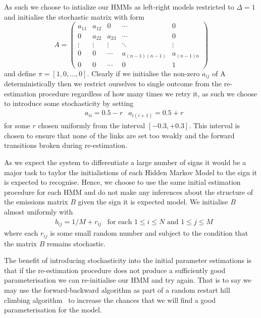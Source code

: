 As such we choose to intialize our HMMs as left-right models restricted to $\Delta = 1$ and initialise the stochastic matrix with form
\begin{equation*}
A =
 \begin{pmatrix}
  a_{11} & a_{12} & 0 & \cdots & 0 \\
  0 & a_{22} & a_{23} &\cdots & 0 \\
  \vdots  & \vdots  & \vdots & \ddots & \vdots  \\
  0 & 0 & \cdots & a_{(n-1)(n-1)}& a_{(n-1)n} \\
  0 & 0 & \cdots & 0& 1
 \end{pmatrix}
\end{equation*}
and define $\pi = [1,0, \dots, 0]$. Clearly if we initialise the non-zero $a_{ij}$ of A deterministically then we restrict ourselves to single outcome from the re-estimation procedure regardless of how many times we retry it, as such we choose to introduce some stochasticity by setting
\begin{align*}
&a_{ii} = 0.5 - r &a_{i(i+1)} = 0.5 + r
\end{align*}
 for some $r$ chosen uniformly from the interval $[-0.3, +0.3]$. This interval is chosen to ensure that none of the links are set too weakly and the forward transitions broken during re-estimation.

As we expect the system to differentiate a large number of signs it would be a major task to taylor the initialistions of each Hidden Markov Model to the sign it is expected to recognise. Hence, we choose to use the same initial estimation procedure for each HMM and do not make any inferences about the structure of the emissions matrix $B$ given the sign it is expected model. We initialise $B$ almost uniformly with
\begin{align*}
&b_{ij} = 1/M + r_{ij} &\text{for each $1\leq i \leq N$ and $1 \leq j \leq M$}
\end{align*}
where each $r_{ij}$ is some small random number and subject to the condition that the matrix $B$ remains stochastic.

The benefit of introducing stochasticity into the initial parameter estimations is that if the re-estimation procedure does not produce a sufficiently good parameterisation we can re-initialise our HMM and try again. That is to say we may use the forward-backward algorithm as part of a random restart hill climbing algorithm~\citep{russell1995artificial} to increase the chances that we will find a good parameterisation for the model.

